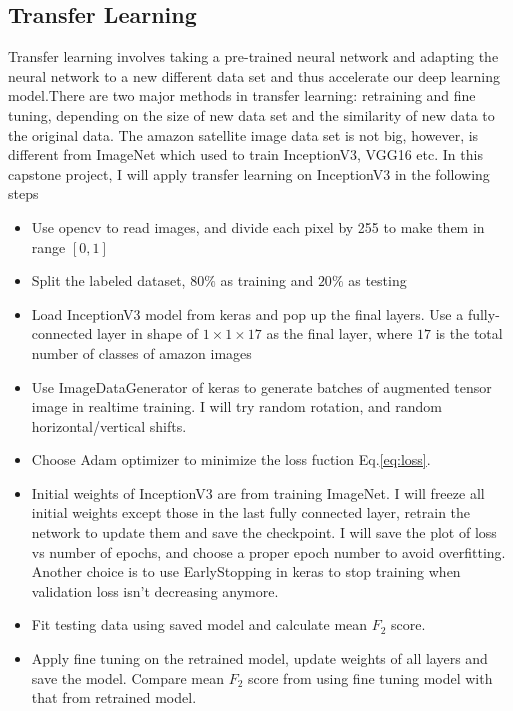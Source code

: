 \documentclass[11pt,oneside,a4paper]{article}
\begin{document}
\begin{multicols}{2}
\subsection{Transfer Learning}
Transfer learning involves taking a pre-trained neural network and adapting the neural network to a new different data set and thus accelerate our deep learning model.There are two major methods in transfer learning: retraining and fine tuning, depending on the size of new data set and the similarity of new data to the original data. The amazon satellite image data set is not big, however, is different from ImageNet which used to train InceptionV3, VGG16 etc. In this capstone project, I will apply transfer learning on InceptionV3 in the following steps

\begin{itemize}
\item Use opencv to read images, and divide each pixel by 255 to make them in range $[0, 1]$
\item Split the labeled dataset, $80\%$ as training and $20\%$ as testing
\item Load InceptionV3 model from keras and pop up the final layers. Use a fully-connected layer in shape of $1\times1\times17$ as the final layer, where $17$ is the total number of classes of amazon images
\item Use ImageDataGenerator of keras to generate batches of augmented tensor image in realtime training. I will try random rotation, and random horizontal/vertical shifts. 
\item Choose Adam optimizer\cite{adam} to minimize the loss fuction Eq.\ref{eq:loss}.
\item Initial weights of InceptionV3 are from training ImageNet. I will freeze all initial weights except those in the last fully connected layer, retrain the network to update them and save the checkpoint. I will save the plot of loss vs number of epochs, and choose a proper epoch number to avoid overfitting. Another choice is to use EarlyStopping in keras to stop training when validation loss isn't decreasing anymore.
\item Fit testing data using saved model and calculate mean $F_2$ score.
\item Apply fine tuning on the retrained model, update weights of all layers and save the model. Compare mean $F_2$ score from using fine tuning model with that from retrained model. 
\end{itemize}




\end{multicols}
{}

\end{document}
